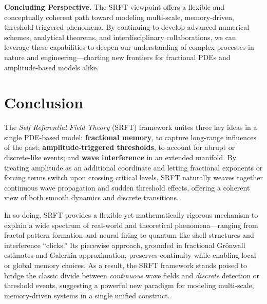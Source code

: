 \documentclass[12pt]{article}
\begin{document}
\noindent
\textbf{Concluding Perspective.} The SRFT viewpoint offers a flexible and 
conceptually coherent path toward modeling multi-scale, memory-driven, threshold-triggered
phenomena. By continuing to develop advanced numerical schemes, analytical 
theorems, and interdisciplinary collaborations, we can leverage these 
capabilities to deepen our understanding of complex processes in nature and 
engineering—charting new frontiers for fractional PDEs and amplitude-based 
models alike.
\section{Conclusion}
\label{sec:conclusion}

The \emph{Self Referential Field Theory } (SRFT) framework unites three key ideas 
in a single PDE-based model: \textbf{fractional memory}, to capture long-range 
influences of the past; \textbf{amplitude-triggered thresholds}, to account for 
abrupt or discrete-like events; and \textbf{wave interference} in an extended 
manifold. By treating amplitude as an additional coordinate and letting 
fractional exponents or forcing terms switch upon crossing critical levels, 
SRFT naturally weaves together continuous wave propagation and sudden threshold 
effects, offering a coherent view of both smooth dynamics and discrete 
transitions.

In so doing, SRFT provides a flexible yet mathematically rigorous mechanism to 
explain a wide spectrum of real-world and theoretical phenomena—ranging from 
fractal pattern formation and neural firing to quantum-like shell structures 
and interference “clicks.” Its piecewise approach, grounded in fractional 
Grönwall estimates and Galerkin approximation, preserves continuity while 
enabling local or global memory choices. As a result, the SRFT framework stands 
poised to bridge the classic divide between \emph{continuous} wave fields 
and \emph{discrete} detection or threshold events, suggesting a powerful new 
paradigm for modeling multi-scale, memory-driven systems in a single unified 
construct.


%
%
\end{document}
